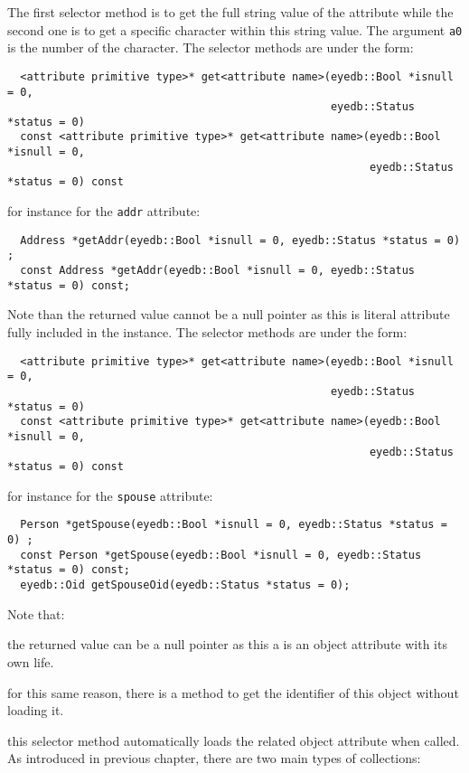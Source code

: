 The first selector method is to get the full string value of the attribute
while the second one is to get a specific character within this string value.
The argument \texttt{a0} is the number of the character.
The selector methods are under the form:
\verbsize
\begin{verbatim}
  <attribute primitive type>* get<attribute name>(eyedb::Bool *isnull = 0,
                                                  eyedb::Status *status = 0)
  const <attribute primitive type>* get<attribute name>(eyedb::Bool *isnull = 0,
                                                        eyedb::Status *status = 0) const
\end{verbatim}
\normalsize
for instance for the \texttt{addr} attribute:
\verbsize
\begin{verbatim}
  Address *getAddr(eyedb::Bool *isnull = 0, eyedb::Status *status = 0) ;
  const Address *getAddr(eyedb::Bool *isnull = 0, eyedb::Status *status = 0) const;
\end{verbatim}
\normalsize
Note than the returned value cannot be a null pointer as this is literal
attribute fully included in the instance.
The selector methods are under the form:
\verbsize
\begin{verbatim}
  <attribute primitive type>* get<attribute name>(eyedb::Bool *isnull = 0,
                                                  eyedb::Status *status = 0)
  const <attribute primitive type>* get<attribute name>(eyedb::Bool *isnull = 0,
                                                        eyedb::Status *status = 0) const
\end{verbatim}
\normalsize
for instance for the \texttt{spouse} attribute:
\verbsize
\begin{verbatim}
  Person *getSpouse(eyedb::Bool *isnull = 0, eyedb::Status *status = 0) ;
  const Person *getSpouse(eyedb::Bool *isnull = 0, eyedb::Status *status = 0) const;
  eyedb::Oid getSpouseOid(eyedb::Status *status = 0);
\end{verbatim}
\normalsize
Note that:
\be
\item the returned value can be a null pointer as this a is
an object attribute with its own life.
\item for this same reason, there is a method to get the identifier of this
object without loading it.
\item this selector method automatically loads the related object attribute
when called.
\ee
{}
As introduced in previous chapter, there are two main types of collections:
